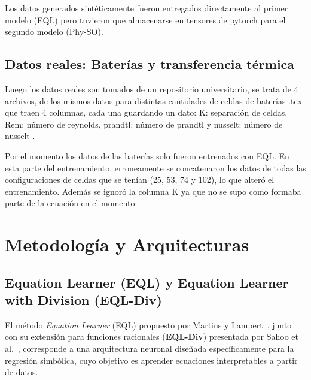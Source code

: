Los datos generados sintéticamente fueron entregados directamente al primer modelo (EQL) pero tuvieron que almacenarse en tensores de pytorch para el segundo modelo (Phy-SO).



\subsection{Datos reales: Baterías y transferencia térmica}

Luego los datos reales son tomados de un repositorio universitario, se trata de 4 archivos, de los mismos datos para distintas cantidades de celdas de baterías .tex que traen 4 columnas, cada una guardando un dato: K: separación de celdas, Rem: número de reynolds, prandtl: número de prandtl y nusselt: número de nusselt \cite{3}. 

Por el momento los datos de las baterías solo fueron entrenados con EQL. En esta parte del entrenamiento, erroneamente se concatenaron los datos de todas las configuraciones de celdas que se tenían (25, 53, 74 y 102), lo que alteró el entrenamiento. Además se ignoró la columna K ya que no se supo como formaba parte de la ecuación en el momento.\\


\newpage
\section{Metodología y Arquitecturas}

\subsection{Equation Learner (EQL) y Equation Learner with Division (EQL-Div)}

El método \textit{Equation Learner} (EQL) propuesto por Martius y Lampert~\cite{1}, junto con su extensión para funciones racionales (\textbf{EQL-Div}) presentada por Sahoo et al.~\cite{2}, corresponde a una arquitectura neuronal diseñada específicamente para la regresión simbólica, cuyo objetivo es aprender ecuaciones interpretables a partir de datos. \\

